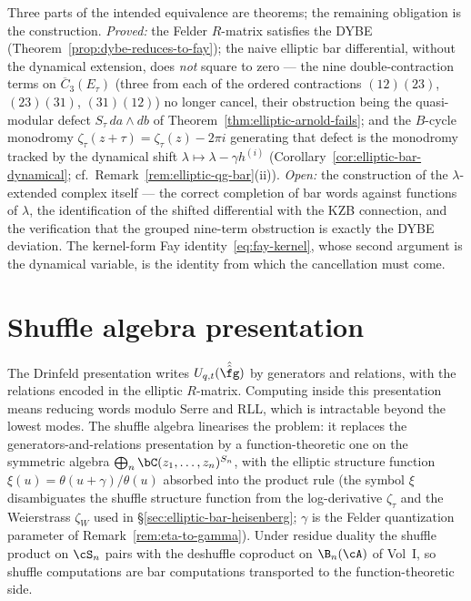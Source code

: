 \begin{remark}
\label{rem:dynamical-bar-status}
Three parts of the intended equivalence are theorems; the remaining
obligation is the construction. \emph{Proved:} the Felder $R$-matrix
satisfies the DYBE (Theorem~\ref{prop:dybe-reduces-to-fay}); the
naive elliptic bar differential, without the dynamical extension,
does \emph{not} square to zero --- the nine double-contraction terms
on $\overline{C}_3(E_\tau)$ (three from each of the ordered
contractions $(12)(23)$, $(23)(31)$, $(31)(12)$) no longer cancel,
their obstruction being the quasi-modular defect
$S_\tau\,da\wedge db$ of Theorem~\ref{thm:elliptic-arnold-fails};
and the $B$-cycle monodromy
$\zeta_\tau(z+\tau) = \zeta_\tau(z) - 2\pi i$ generating that defect
is the monodromy tracked by the dynamical shift
$\lambda \mapsto \lambda - \gamma h^{(i)}$
(Corollary~\ref{cor:elliptic-bar-dynamical};
cf.\ Remark~\ref{rem:elliptic-qg-bar}(ii)). \emph{Open:} the
construction of the $\lambda$-extended complex itself --- the correct
completion of bar words against functions of $\lambda$, the
identification of the shifted differential with the KZB connection,
and the verification that the grouped nine-term obstruction is
exactly the DYBE deviation. The kernel-form Fay
identity~\eqref{eq:fay-kernel}, whose second argument is the
dynamical variable, is the identity from which the cancellation must
come.
\end{remark}


\section{Shuffle algebra presentation}
\label{sec:shuffle-algebra}

The Drinfeld presentation writes $U_{q,t}(\hat{\hat{\fg}})$ by generators and
relations, with the relations encoded in the elliptic $R$-matrix. Computing
inside this presentation means reducing words modulo Serre and RLL, which
is intractable beyond the lowest modes. The shuffle algebra linearises the
problem: it replaces the generators-and-relations presentation by a
function-theoretic one on the symmetric algebra
$\bigoplus_n \bC(z_1,\ldots,z_n)^{S_n}$, with the elliptic structure
function $\xi(u) = \theta(u+\gamma)/\theta(u)$ absorbed into the product
rule (the symbol $\xi$ disambiguates the shuffle structure function from the log-derivative $\zeta_\tau$ and the Weierstrass $\zeta_W$ used in \S\ref{sec:elliptic-bar-heisenberg}; $\gamma$ is the Felder quantization parameter of Remark~\ref{rem:eta-to-gamma}). Under residue duality the shuffle product on $\cS_n$ pairs with the deshuffle coproduct on $\B_n(\cA)$ of Vol~I, so shuffle computations are bar computations transported to the function-theoretic side.

